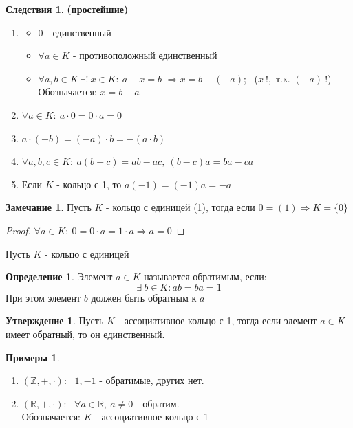 \documentclass[a4paper, 12pt]{article}
\newcommand{\R}{\mathbb R}
\newcommand{\Z}{\mathbb Z}
\newcommand\tab[1][.5cm]{\hspace*{#1}}
\theoremstyle{definition}
\newtheorem*{definition}{Определение}
\newtheorem*{consequenses}{Следствия}
\newtheorem*{subtheorem}{Утверждение}
\newtheorem*{remark}{Замечание}
\newtheorem*{example}{Примеры}
\begin{document}
  \begin{consequenses} \textbf{(простейшие)} 
    \begin{enumerate}
      \item \begin{itemize}
        \item $0$ - единственный
        \item $\forall a\in K$ - противоположный единственный
        \item $\forall a, b\in K \ \exists! \ x \in K: \ a+x=b$ $\Longrightarrow  x = b+(-a)$; \  ($x \ !,$ т.к. $(-a) \ !$) \\   
        Обозначается: $x = b-a$ 
      \end{itemize}
      \item $\forall a \in K: \ a \cdot 0=0 \cdot a = 0$
      \item $a\cdot(-b) = (-a)\cdot b = -(a\cdot b)$  
      \item $\forall a, b, c \in K: \ a(b-c) = ab-ac, \ (b-c)a = ba-ca$ 
      \item Если $K$ - кольцо с 1, то $a(-1) = (-1)a = -a$ 
    \end{enumerate}
  \end{consequenses}
  \begin{remark}
    Пусть $K$ - кольцо с единицей (1), тогда если $0 = (1) \Longrightarrow K = \{0\}$ 
  \end{remark}
  \begin{proof}
    $\forall a \in K: \ 0 = 0 \cdot a= 1 \cdot a \Longrightarrow a = 0$ 
  \end{proof} 
  Пусть $K$ - кольцо с единицей 
  \begin{definition}
      Элемент $a \in K$ называется обратимым, если: $$\exists \ b \in K: ab =ba = 1$$ 
      При этом элемент $b$ должен быть обратным к $a$   
  \end{definition}  
  \begin{subtheorem}
    Пусть $K$ - ассоциативное кольцо с 1, тогда если элемент $a \in K$ имеет обратный, то он единственный.  
  \end{subtheorem} 
  \begin{example} \tab
    \begin{enumerate}
      \item $(\Z, +, \cdot)$: \  $1, -1$ - обратимые, других нет.
      \item $(\R, +, \cdot)$: \ $\forall a \in \R, \ a \neq 0$ - обратим. \\
      Обозначается: $K$ - ассоциативное кольцо с 1  
    \end{enumerate}
  \end{example}
\end{document}
